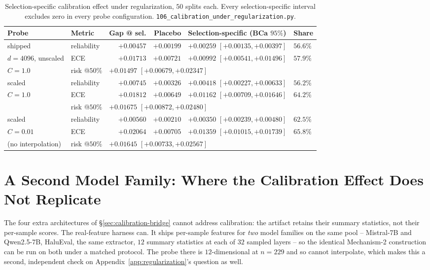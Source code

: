 \documentclass{article}
\begin{document}
\begin{table}[h]
\centering
\small
{\setlength{\tabcolsep}{4pt}
\begin{tabular}{@{}llrrll@{}}
\toprule
Probe & Metric & Gap @ sel. & Placebo & Selection-specific (BCa $95\%$) & Share \\
\midrule
shipped              & reliability & $+0.00457$ & $+0.00199$ & $+0.00259$ $[+0.00135,+0.00397]$ & $56.6\%$ \\
$d{=}4096$, unscaled & ECE         & $+0.01713$ & $+0.00721$ & $+0.00992$ $[+0.00541,+0.01496]$ & $57.9\%$ \\
$C{=}1.0$            & risk @$50\%$ & \multicolumn{4}{l}{$+0.01497$ $[+0.00679,+0.02347]$} \\
\midrule
scaled               & reliability & $+0.00745$ & $+0.00326$ & $+0.00418$ $[+0.00227,+0.00633]$ & $56.2\%$ \\
$C{=}1.0$            & ECE         & $+0.01812$ & $+0.00649$ & $+0.01162$ $[+0.00709,+0.01646]$ & $64.2\%$ \\
                     & risk @$50\%$ & \multicolumn{4}{l}{$+0.01675$ $[+0.00872,+0.02480]$} \\
\midrule
scaled               & reliability & $+0.00560$ & $+0.00210$ & $+0.00350$ $[+0.00239,+0.00480]$ & $62.5\%$ \\
$C{=}0.01$           & ECE         & $+0.02064$ & $+0.00705$ & $+0.01359$ $[+0.01015,+0.01739]$ & $65.8\%$ \\
(no interpolation)   & risk @$50\%$ & \multicolumn{4}{l}{$+0.01645$ $[+0.00733,+0.02567]$} \\
\bottomrule
\end{tabular}}
\caption{Selection-specific calibration effect under regularization, $50$
splits each. Every selection-specific interval excludes zero in every probe
configuration. \texttt{106\_calibration\_under\_regularization.py}.}
\label{tab:reg}
\end{table}

\section{A Second Model Family: Where the Calibration Effect Does Not Replicate}
\label{app:secondfamily}

The four extra architectures of \S\ref{sec:calibration-bridge} cannot address
calibration: the artifact retains their summary statistics, not their
per-sample scores. The real-feature harness can. It ships per-sample features
for \emph{two} model families on the same pool -- Mistral-7B and Qwen2.5-7B,
HaluEval, the same extractor, $12$ summary statistics at each of $32$ sampled
layers -- so the identical Mechanism-2 construction can be run on both under a
matched protocol. The probe there is $12$-dimensional at $n{=}229$ and so
cannot interpolate, which makes this a second, independent check on
Appendix~\ref{app:regularization}'s question as well.
\end{document}
